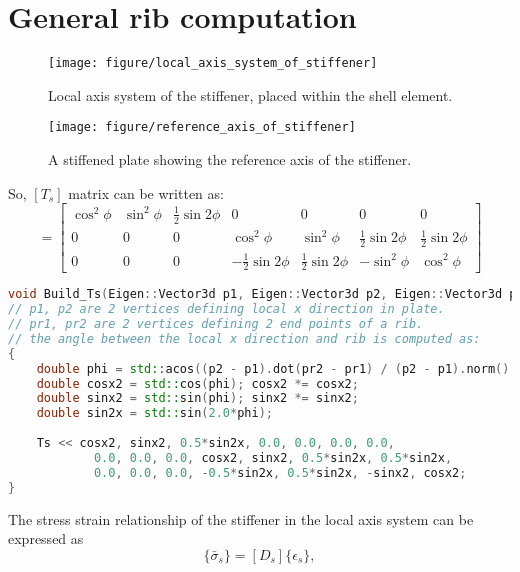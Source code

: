 
\section{General rib computation}
\begin{figure}[h!]
\centering
\texttt{[image: figure/local\_axis\_system\_of\_stiffener]}
\caption{Local axis system of the stiffener, placed within the shell element.}
\label{fig:localaxissystemofstiffener}
\end{figure}

\begin{figure}[h!]
\centering
\texttt{[image: figure/reference\_axis\_of\_stiffener]}
\caption{A stiffened plate showing the reference axis of the stiffener.}
\label{fig:referenceaxisofstiffener}
\end{figure}

So, $ [T_s] $ matrix can be written as:
\begin{equation}
[T_s] = \begin{bmatrix}
\cos^2\phi & \sin^2 \phi & \frac{1}{2} \sin 2\phi & 0 & 0 & 0 & 0 \\ 
0 & 0 & 0 & \cos^2 \phi & \sin^2 \phi & \frac{1}{2} \sin 2\phi & \frac{1}{2} \sin 2\phi \\ 
0 & 0 & 0 & -\frac{1}{2} \sin 2\phi & \frac{1}{2} \sin 2\phi & -\sin^2 \phi & \cos^2 \phi
\end{bmatrix}
\end{equation}

\begin{lstlisting}[language=c++]
void Build_Ts(Eigen::Vector3d p1, Eigen::Vector3d p2, Eigen::Vector3d pr1, Eigen::Vector3d pr2, Eigen::Matrix<double, 3, 7> &Ts)
// p1, p2 are 2 vertices defining local x direction in plate.
// pr1, pr2 are 2 vertices defining 2 end points of a rib.
// the angle between the local x direction and rib is computed as:
{
	double phi = std::acos((p2 - p1).dot(pr2 - pr1) / (p2 - p1).norm() / (pr2 - pr1).norm());
	double cosx2 = std::cos(phi); cosx2 *= cosx2;
	double sinx2 = std::sin(phi); sinx2 *= sinx2;
	double sin2x = std::sin(2.0*phi);
	
	Ts << cosx2, sinx2, 0.5*sin2x, 0.0, 0.0, 0.0, 0.0,
			0.0, 0.0, 0.0, cosx2, sinx2, 0.5*sin2x, 0.5*sin2x,
			0.0, 0.0, 0.0, -0.5*sin2x, 0.5*sin2x, -sinx2, cosx2;
}
\end{lstlisting}

The stress strain relationship of the stiffener in the local axis system can be expressed as
\begin{equation}
\{\bar{\sigma}_s\} = [D_s]\{\epsilon_s\},
\end{equation}

